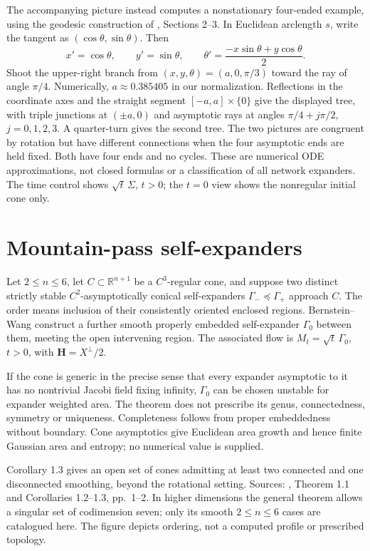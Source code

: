 \begin{example}
The accompanying picture instead computes a nonstationary four-ended example, using the geodesic construction of \cite{CatMS07}, Sections 2--3. In Euclidean arclength $s$, write the tangent as $(\cos\theta,\sin\theta)$. Then
\[
 x'=\cos\theta,\qquad y'=\sin\theta,\qquad
 \theta'=\frac{-x\sin\theta+y\cos\theta}{2}.
\]
Shoot the upper-right branch from $(x,y,\theta)=(a,0,\pi/3)$ toward the ray of angle $\pi/4$. Numerically, $a\approx0.385405$ in our normalization. Reflections in the coordinate axes and the straight segment $[-a,a]\times\{0\}$ give the displayed tree, with triple junctions at $(\pm a,0)$ and asymptotic rays at angles $\pi/4+j\pi/2$, $j=0,1,2,3$. A quarter-turn gives the second tree. The two pictures are congruent by rotation but have different connections when the four asymptotic ends are held fixed. Both have four ends and no cycles. These are numerical ODE approximations, not closed formulas or a classification of all network expanders. The time control shows $\sqrt t\,\Sigma$, $t>0$; the $t=0$ view shows the nonregular initial cone only.
\end{example}

\chapter{Mountain-pass self-expanders}\label{sec:catalogue-mountain-pass-expanders}
\begin{example}\label{ex:catalogue-mountain-pass-expanders}
Let $2\leq n\leq6$, let $C\subset\mathbb R^{n+1}$ be a $C^3$-regular cone, and suppose two distinct strictly stable $C^2$-asymptotically conical self-expanders $\Gamma_-\preceq\Gamma_+$ approach $C$. The order means inclusion of their consistently oriented enclosed regions. Bernstein--Wang construct a further smooth properly embedded self-expander $\Gamma_0$ between them, meeting the open intervening region. The associated flow is $M_t=\sqrt t\,\Gamma_0$, $t>0$, with $\mathbf H=X^\perp/2$.

If the cone is generic in the precise sense that every expander asymptotic to it has no nontrivial Jacobi field fixing infinity, $\Gamma_0$ can be chosen unstable for expander weighted area. The theorem does not prescribe its genus, connectedness, symmetry or uniqueness. Completeness follows from proper embeddedness without boundary. Cone asymptotics give Euclidean area growth and hence finite Gaussian area and entropy; no numerical value is supplied.

Corollary 1.3 gives an open set of cones admitting at least two connected and one disconnected smoothing, beyond the rotational setting. Sources: \cite{CatBWMP20}, Theorem 1.1 and Corollaries 1.2--1.3, pp.~1--2. In higher dimensions the general theorem allows a singular set of codimension seven; only its smooth $2\leq n\leq6$ cases are catalogued here. The figure depicts ordering, not a computed profile or prescribed topology.
\end{example}

